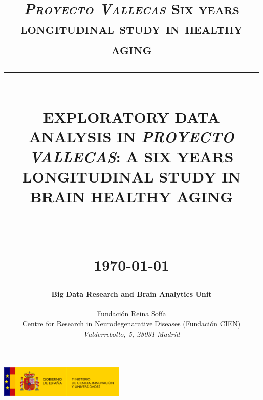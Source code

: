 \documentclass[11pt]{article}
\theoremstyle{definition}
\theoremstyle{remark}
\newcommand{\HRule}[1]{\rule{\linewidth}{#1}}
\begin{document}

\title{ \normalsize \textsc{\emph{Proyecto Vallecas} Six years longitudinal study in healthy aging}
    \\ [2.0cm]
    \HRule{0.5pt} \\
    \LARGE \textbf{\uppercase{Exploratory Data Analysis in \emph{Proyecto Vallecas}: a six years longitudinal study in brain healthy aging}}
    \HRule{2pt} \\ [0.5cm]
    \normalsize \today \vspace*{5\baselineskip}}

\date{ }
\author{
    \textbf{\large{Big Data Research and Brain Analytics Unit}}   \\  \\
    \large{Fundaci\'on Reina Sof\'ia} \\
    Centre for Research in Neurodegenarative Diseases (Fundaci\'on CIEN)
    \\ \emph{Valderrebollo, 5, 28031 Madrid}
 }


\maketitle
\begin{center}
\includegraphics[width = 60mm]{figures/logo_mciu.png}
\end{center}
\newpage
\tableofcontents
\newpage

\sectionfont{\scshape}
\end{document}
